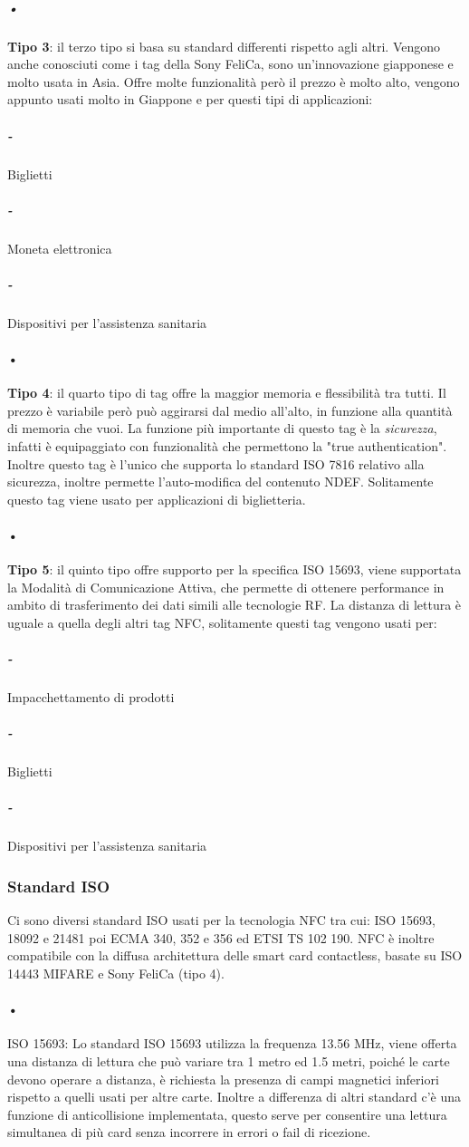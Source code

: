 \subparagraph{•}\textbf{Tipo 3}: il terzo tipo si basa su standard differenti rispetto agli altri. Vengono anche conosciuti come i tag della Sony FeliCa, sono un'innovazione giapponese e molto usata in Asia. Offre molte funzionalità però il prezzo è molto alto, vengono appunto usati molto in Giappone e per questi tipi di applicazioni:
\subparagraph{-} Biglietti
\subparagraph{-} Moneta elettronica
\subparagraph{-} Dispositivi per l'assistenza sanitaria

\paragraph{•}\textbf{Tipo 4}: il quarto tipo di tag offre la maggior memoria e flessibilità tra tutti. Il prezzo è variabile però può aggirarsi dal medio all'alto, in funzione alla quantità di memoria che vuoi. La funzione più importante di questo tag è la \textit{sicurezza}, infatti è equipaggiato con funzionalità che permettono la "true authentication". Inoltre questo tag è l'unico che supporta lo standard ISO 7816 relativo alla sicurezza, inoltre permette l'auto-modifica del contenuto NDEF. Solitamente questo tag viene usato per applicazioni di biglietteria.

\paragraph{•}\textbf{Tipo 5}: il quinto tipo offre supporto per la specifica ISO 15693, viene supportata la Modalità di Comunicazione Attiva, che permette di ottenere performance in ambito di trasferimento dei dati simili alle tecnologie RF. La distanza di lettura è uguale a quella degli altri tag NFC, solitamente questi tag vengono usati per:
\subparagraph{-} Impacchettamento di prodotti
\subparagraph{-} Biglietti
\subparagraph{-} Dispositivi per l'assistenza sanitaria

\subsubsection{Standard ISO}
Ci sono diversi standard ISO usati per la tecnologia NFC tra cui: ISO 15693, 18092 e 21481 poi ECMA 340, 352 e 356 ed ETSI TS 102 190. NFC è inoltre compatibile con la diffusa architettura delle smart card contactless, basate su ISO 14443 MIFARE e Sony FeliCa (tipo 4).

\paragraph{•} ISO 15693: Lo standard ISO 15693 utilizza la frequenza 13.56 MHz, viene offerta una distanza di lettura che può variare tra 1 metro ed 1.5 metri, poiché le carte devono operare a distanza, è richiesta la presenza di campi magnetici inferiori rispetto a quelli usati per altre carte. Inoltre a differenza di altri standard c'è una funzione di anticollisione implementata, questo serve per consentire una lettura simultanea di più card senza incorrere in errori o fail di ricezione.
